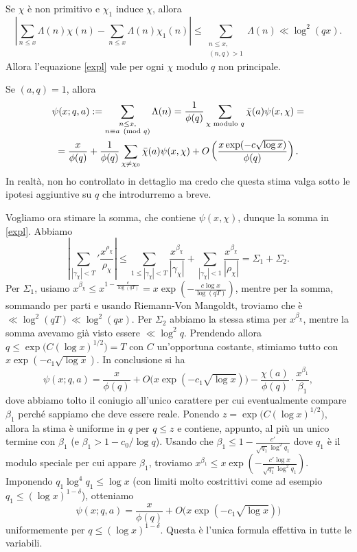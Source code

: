 \begin{oss}
  Se $\chi$ è non primitivo e $\chi_1$ induce $\chi$, allora
  $$\left| \sum_{n \le x} \Lambda(n)\chi(n)-\sum_{n \le x}\Lambda(n)\chi_1(n)\right| \le \sum_{\substack{n \le x,\\ (n,q)>1}} \Lambda(n) \ll \log^2(qx).$$
  Allora l'equazione \eqref{expl} vale per ogni $\chi$ modulo $q$ non principale.
\end{oss}

\begin{cor}
  Se $(a,q)=1$, allora
  \begin{gather*}
    \psi(x;q,a):=\sum_{\substack{n \le x,\\ n \equiv a \pmod{q}}} \Lambda(n)=\frac{1}{\phi(q)} \sum_{\chi\textnormal{ modulo }q} \bar{\chi}(a)\psi(x,\chi)= \\
    =\frac{x}{\phi(q)}+\frac{1}{\phi(q)}\sum_{\chi\not=\chi_0} \bar{\chi}(a)\psi(x,\chi)+O\left(\frac{x\exp(-c\sqrt{\log x})}{\phi(q)}\right).
  \end{gather*}
  In realtà, non ho controllato in dettaglio ma credo che questa stima valga sotto le ipotesi aggiuntive su $q$ che introdurremo a breve.
\end{cor}

Vogliamo ora stimare la somma, che contiene $\psi(x,\chi)$, dunque la somma in \eqref{expl}. Abbiamo
$$\left|\sum_{|\gamma_\chi|<T}' \frac{x^{\rho_\chi}}{\rho_\chi}\right| \le \sum_{1 \le |\gamma_\chi|<T} \frac{x^{\beta_\chi}}{|\gamma_\chi|}+\sum_{|\gamma_\chi| < 1} \frac{x^{\beta_\chi}}{|\rho_\chi|}=\Sigma_1+\Sigma_2.$$
Per $\Sigma_1$, usiamo $x^{\beta_\chi} \le x^{1-\frac{c}{\log(qT)}}=x\exp\left(-\frac{c\log{x}}{\log(qT)}\right)$, mentre per la somma, sommando per parti e usando Riemann-Von Mangoldt, troviamo che è $\ll \log^2(qT) \ll \log^2(qx)$. Per $\Sigma_2$ abbiamo la stessa stima per $x^{\beta_\chi}$, mentre la somma avevamo già visto essere $\ll \log^2{q}$.
Prendendo allora $q \le \exp\big(C(\log{x})^{1/2}\big)=T$ con $C$ un'opportuna costante, stimiamo tutto con $x\exp(-c_1\sqrt{\log{x}})$. In conclusione si ha
$$\psi(x;q,a)=\frac{x}{\phi(q)}+O\big(x\exp(-c_1\sqrt{\log{x}})\big)-\frac{\chi(a)}{\phi(q)}\cdot\frac{x^{\beta_1}}{\beta_1},$$
dove abbiamo tolto il coniugio all'unico carattere per cui eventualmente compare $\beta_1$ perché sappiamo che deve essere reale. Ponendo $z=\exp\big(C(\log{x})^{1/2}\big)$, allora la stima è uniforme in $q$ per $q \le z$ e contiene, appunto, al più un unico termine con $\beta_1$ (e $\beta_1>1-c_0/\log{q}$).
Usando che $\beta_1 \le 1-\frac{c'}{\sqrt{q_1}\log^2{q_1}}$ dove $q_1$ è il modulo speciale per cui appare $\beta_1$, troviamo $x^{\beta_1} \le x\exp\left(-\frac{c'\log{x}}{\sqrt{q_1}\log^2{q_1}}\right)$.
Imponendo $q_1\log^4{q_1} \le \log{x}$ (con limiti molto costrittivi come ad esempio $q_1 \le (\log{x})^{1-\delta}$), otteniamo
$$\psi(x;q,a)=\frac{x}{\phi(q)}+O\big(x\exp(-c_1\sqrt{\log{x}})\big)$$
uniformemente per $q \le (\log{x})^{1-\delta}$. Questa è l'unica formula effettiva in tutte le variabili.

